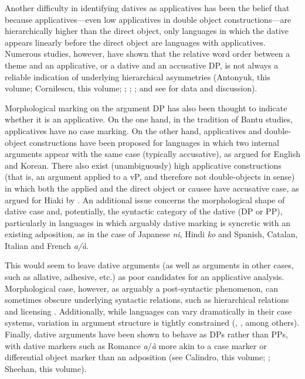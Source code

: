 \documentclass[output=paper,modfonts,nonflat]{langsci/langscibook}
\begin{document}
Another difficulty in identifying datives as applicatives has been the belief that because applicatives—even low applicatives in double object constructions—are hierarchically higher than the direct object, only languages in which the dative appears linearly before the direct object are languages with applicatives. Numerous studies, however, have shown that the relative word order between a theme and an applicative, or a dative and an accusative DP, is not always a reliable indication of underlying hierarchical asymmetries (Antonyuk, this volume; Cornilescu, this volume; \citealt{Cuervo2003}; \citealt{Demonte1995}; \citealt{MiyagawaTsujioka2004}; and see \citealt{McGinnis2018} for data and discussion).   

Morphological marking on the argument DP has also been thought to indicate whether it is an applicative. On the one hand, in the tradition of Bantu studies, applicatives have no case marking. On the other hand, applicatives and double-object constructions have been proposed for languages in which two internal arguments appear with the same case (typically accusative), as argued for English and Korean. There also exist (unambiguously) high applicative constructions (that is, an argument applied to a vP, and therefore not double-objects in  sense) in which both the applied and the direct object or causee have accusative case, as argued for Hiaki by \citet{Harley2013}. An additional issue concerns the morphological shape of dative case and, potentially, the syntactic category of the dative (DP or PP), particularly in languages in which arguably dative marking is syncretic with an existing adposition, as in the case of Japanese \textit{ni}, Hindi \textit{ko} and Spanish, Catalan, Italian and French \textit{a/à}.

This would seem to leave dative arguments (as well as arguments in other cases, such as allative, adhesive, etc.) as poor candidates for an applicative analysis. Morphological case, however, as arguably a post-syntactic phenomenon, can sometimes obscure underlying syntactic relations, such as hierarchical relations and licensing \citep{McGinnis2018}. Additionally, while languages can vary dramatically in their case systems, variation in argument structure is tightly constrained (\citealt{Marantz2013}, \citealt{WoodMarantz2017}, among others). Finally, dative arguments have been shown to behave as DPs rather than PPs, with dative markers such as Romance \textit{a}/\textit{à} more akin to a case marker or differential object marker than an adposition (see Calindro, this volume; \citealt{Pineda2016}; Sheehan, this volume). 
\end{document}
